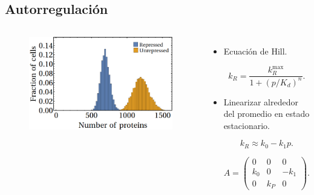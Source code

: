 \documentclass[xcolor=dvipsnames]{beamer}
\begin{document}
\subsection{Autorregulaci\'on}
\begin{frame}

\begin{columns}[c]
\begin{figure}[p]
    \centering
    \includegraphics[width=1\textwidth]{mas-hist}
\end{figure}

\begin{itemize}

\item Ecuaci\'on de Hill.

\begin{equation*}
k_R = \frac{k_R^{\text{max}}}{1+(p/K_d)^n}.
\end{equation*}

\item Linearizar alrededor del promedio en estado estacionario.

\begin{equation*}
k_R \approx k_0-k_1p.
\end{equation*}

\begin{equation*}
A = 
\begin{pmatrix}
0 & 0 & 0 \\
k_0 & 0 & -k_1 \\
0 & k_P & 0
\end{pmatrix}.
\end{equation*}

\end{itemize}
\end{columns}
\end{frame}
\end{document}
